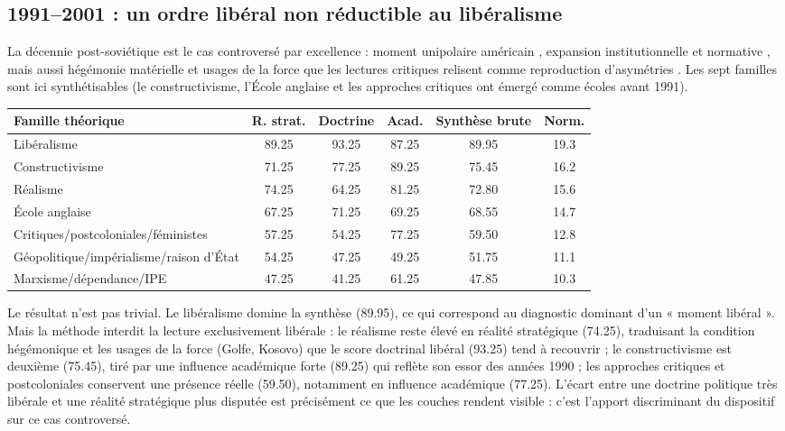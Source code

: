 \documentclass[11pt,a4paper]{article}
\begin{document}
\subsection{1991--2001 : un ordre libéral non réductible au libéralisme}

La décennie post-soviétique est le cas controversé par excellence : moment unipolaire américain \citep{krauthammer1990unipolar}, expansion institutionnelle et normative \citep{ikenberry2001after,ikenberry2011liberal}, mais aussi hégémonie matérielle et usages de la force que les lectures critiques relisent comme reproduction d'asymétries \citep{cox1981social,said1978orientalism}. Les sept familles sont ici synthétisables (le constructivisme, l'École anglaise et les approches critiques ont émergé comme écoles avant 1991).

\begin{center}
\begin{tabular}{p{4.4cm}ccccc}
\hline
Famille théorique & R. strat. & Doctrine & Acad. & Synthèse brute & Norm. \\
\hline
Libéralisme & 89.25 & 93.25 & 87.25 & 89.95 & 19.3 \\
Constructivisme & 71.25 & 77.25 & 89.25 & 75.45 & 16.2 \\
Réalisme & 74.25 & 64.25 & 81.25 & 72.80 & 15.6 \\
École anglaise & 67.25 & 71.25 & 69.25 & 68.55 & 14.7 \\
Critiques/postcoloniales/féministes & 57.25 & 54.25 & 77.25 & 59.50 & 12.8 \\
Géopolitique/impérialisme/raison d'État & 54.25 & 47.25 & 49.25 & 51.75 & 11.1 \\
Marxisme/dépendance/IPE & 47.25 & 41.25 & 61.25 & 47.85 & 10.3 \\
\hline
\end{tabular}
\end{center}

Le résultat n'est pas trivial. Le libéralisme domine la synthèse (89.95), ce qui correspond au diagnostic dominant d'un « moment libéral ». Mais la méthode interdit la lecture exclusivement libérale : le réalisme reste élevé en réalité stratégique (74.25), traduisant la condition hégémonique et les usages de la force (Golfe, Kosovo) que le score doctrinal libéral (93.25) tend à recouvrir ; le constructivisme est deuxième (75.45), tiré par une influence académique forte (89.25) qui reflète son essor des années 1990 \citep{finnemore1998norm,wendt1999social} ; les approches critiques et postcoloniales conservent une présence réelle (59.50), notamment en influence académique (77.25). L'écart entre une doctrine politique très libérale et une réalité stratégique plus disputée est précisément ce que les couches rendent visible : c'est l'apport discriminant du dispositif sur ce cas controversé.
\end{document}
